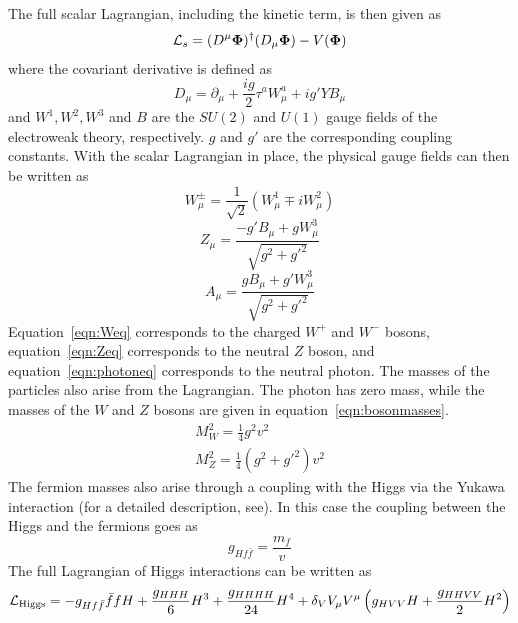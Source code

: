 %
The full scalar Lagrangian, including the kinetic term, is then given as 
%
\begin{equation}
\mathcal{L}_s = (D^\mu \mathbf{\Phi})^\dagger(D_\mu\mathbf{\Phi}) - V(\mathbf{\Phi})
\end{equation}
%
where the covariant derivative is defined as 
%
\begin{equation}
D_\mu = \partial_\mu + \frac{ig}{2}\tau^aW_\mu^a + ig'YB_\mu
\end{equation}
%
and $W^1, W^2, W^3$ and $B$ are the $SU(2)$ and $U(1)$ gauge fields of the electroweak theory, respectively. $g$ and $g'$ are the corresponding coupling constants. With the scalar Lagrangian in place, the physical gauge fields can then be written as 
%
\begin{equation}
\label{eqn:Weq}
W_\mu^\pm = \frac{1}{\sqrt{2}}(W_\mu^1 \mp iW_\mu^2) 
\end{equation}
%
\begin{equation}
\label{eqn:Zeq}
Z_\mu = \frac{-g'B_\mu + gW_\mu^3}{\sqrt{g^2 + g'^2}} 
\end{equation}
%
\begin{equation}
\label{eqn:photoneq}
A_\mu = \frac{gB_\mu + g'W_\mu^3}{\sqrt{g^2 + g'^2}}
\end{equation}
%
Equation~\ref{eqn:Weq} corresponds to the charged $W^+$ and $W^-$ bosons, equation~\ref{eqn:Zeq} corresponds to the neutral $Z$ boson, and equation~\ref{eqn:photoneq} corresponds to the neutral photon. The masses of the particles also arise from the Lagrangian. The photon has zero mass, while the masses of the $W$ and $Z$ bosons are given in equation~\ref{eqn:bosonmasses}.
%
\begin{equation}
\label{eqn:bosonmasses}
\begin{array}{c}
M_W^2 = \frac{1}{4}g^2v^2 \\ 
M_Z^2 = \frac{1}{4}(g^2 + g'^2)v^2
\end{array}
\end{equation}
%
The fermion masses also arise through a coupling with the Higgs via the Yukawa interaction (for a detailed description, see\cite{Dawson}). In this case the coupling between the Higgs and the fermions goes as 
%
\begin{equation}
\label{eqn:higgs-fermions}
g_{Hf\bar{f}} = \frac{m_f}{v}
\end{equation} 
%
The full Lagrangian of Higgs interactions can be written as 
%
\begin{equation}
\mathcal{L}_{\rm Higgs} = -g_{Hf\bar{f}}\bar{f}fH + \frac{g_{HHH}}{6}H^3 + \frac{g_{HHHH}}{24}H^4 + \delta_V V_\mu V^\mu\left(g_{HVV} H + \frac{g_{HHVV}}{2}H^2\right)
\end{equation}
